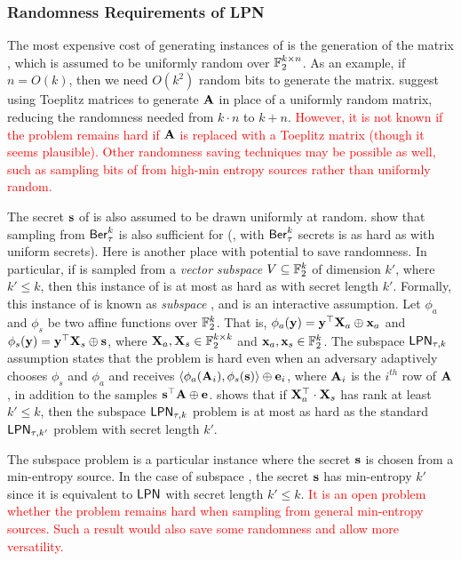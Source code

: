 \subsubsection{Randomness Requirements of LPN}
The most expensive cost of generating instances of \LPN is the generation of the matrix \bA, which is assumed to be uniformly random over ${\mathbb F}_2^{k\times n}$.
As an example, if $n = O(k)$, then we need $O(k^2)$ random bits to generate the matrix.
\cite{EC:GilRobSeu08} suggest using Toeplitz matrices to generate ${\mathbf A}$ in place of a uniformly random matrix, reducing the randomness needed from $k\cdot n$ to $k + n$.
\textcolor{red}{However, it is not known if the \LPN problem remains hard if ${\mathbf A}$ is replaced with a Toeplitz matrix (though it seems plausible).
Other randomness saving techniques may be possible as well, such as sampling bits of \bA from high-min entropy sources rather than uniformly random.}

The secret ${\mathbf s}$ of \LPN is also assumed to be drawn uniformly at random.
\cite{C:ACPS09} show that sampling \bs from $\mathsf{Ber}_\tau^k$ is also sufficient for \LPN (\ie, \LPN with $\mathsf{Ber}_\tau^k$ secrets is as hard as with uniform secrets).
Here is another place with potential to save randomness.
In particular, if \bs is sampled from a {\em vector subspace} $V \subseteq {\mathbb F}_2^k$ of dimension $k'$, where $k' \leq k$, then this instance of \LPN is at most as hard as \LPN with secret length $k'$.
Formally, this instance of \LPN is known as {\em subspace} \LPN \cite{TCC:Pietrzak12}, and is an interactive assumption.
Let $\phi_a$ and $\phi_s$ be two affine functions over ${\mathbb F}_2^k$. 
That is, $\phi_a({\mathbf y}) = {\mathbf y}^\top{\mathbf X}_a \oplus {\mathbf x}_a$ and $\phi_s({\mathbf y}) = {\mathbf y}^\top{\mathbf X}_s \oplus {\mathbf s}$, where ${\mathbf X}_a,{\mathbf X}_s \in {\mathbb F}_2^{k \times k}$ and ${\mathbf x}_a,{\mathbf x}_s \in {\mathbb F}_2^k$.
The subspace $\mathsf{LPN}_{\tau, k}$ assumption states that the \LPN problem is hard even when an adversary adaptively chooses $\phi_s$ and $\phi_a$ and receives $\ip{\phi_a(\bA_i)}{\phi_s(\bs)}\oplus \be_i$, where ${\mathbf A}_i$ is the $i^{th}$ row of ${\mathbf A}$, in addition to the samples ${\mathbf s}^\top{\mathbf A} \oplus {\mathbf e}$.
\cite{TCC:Pietrzak12} shows that if ${\mathbf X}_a^\top \cdot {\mathbf X}_s$ has rank at least $k' \leq k$, then the subspace $\mathsf{LPN}_{\tau,k}$ problem is at most as hard as the standard $\mathsf{LPN}_{\tau, k'}$ problem with secret length $k'$.

The subspace \LPN problem is a particular instance where the secret ${\mathbf s}$ is chosen from a min-entropy source.
In the case of subspace \LPN, the secret ${\mathbf s}$ has min-entropy $k'$ since it is equivalent to $\mathsf{LPN}$ with secret length $k' \leq k$.
\textcolor{red}{It is an open problem whether the \LPN problem remains hard when sampling \bs from general min-entropy sources.
Such a result would also save some randomness and allow more versatility.}

